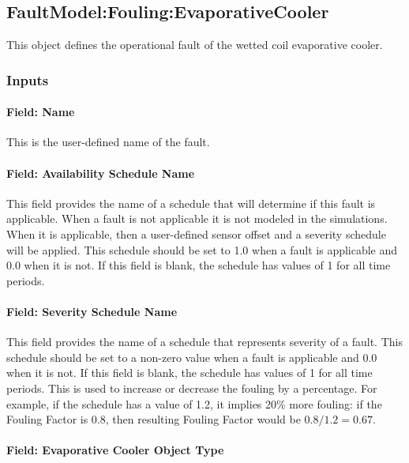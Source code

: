 \subsection{FaultModel:Fouling:EvaporativeCooler}\label{faultmodelfoulingevapcooler}

This object defines the operational fault of the wetted coil evaporative cooler.

\subsubsection{Inputs}

\paragraph{Field: Name}

This is the user-defined name of the fault.

\paragraph{Field: Availability Schedule Name}

This field provides the name of a schedule that will determine if this fault is applicable. When a fault is not applicable it is not modeled in the simulations. When it is applicable, then a user-defined sensor offset and a severity schedule will be applied. This schedule should be set to 1.0 when a fault is applicable and 0.0 when it is not. If this field is blank, the schedule has values of 1 for all time periods.

\paragraph{Field: Severity Schedule Name}

This field provides the name of a schedule that represents severity of a fault. This schedule should be set to a non-zero value when a fault is applicable and 0.0 when it is not. If this field is blank, the schedule has values of 1 for all time periods.
This is used to increase or decrease the fouling by a percentage. For example, if the schedule has a value of 1.2, it implies 20\% more fouling: if the Fouling Factor is 0.8, then resulting Fouling Factor would be $0.8 / 1.2 = 0.67$.

\paragraph{Field: Evaporative Cooler Object Type}\label{field-evaporative-cooler-object-type}

